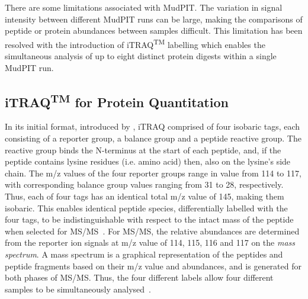 \documentclass[11pt,a4paper]{article}
\begin{document}


There are some limitations associated with MudPIT. The variation in signal intensity between different MudPIT runs can be large, making the comparisons of peptide or protein abundances between samples difficult. This limitation has been resolved with the introduction of iTRAQ\textsuperscript{TM} labelling which enables the simultaneous analysis of up to eight distinct protein digests within a single MudPIT run.

\subsection{iTRAQ\textsuperscript{TM} for Protein Quantitation}\label{subsec:iTRAQ}
In its initial format, introduced by \cite{Ross2004}, iTRAQ comprised of four isobaric tags, each consisting of a reporter group, a balance group and a peptide reactive group. The reactive group binds the N-terminus at the start of each peptide, and, if the peptide contains lysine residues (i.e. amino acid) then, also on the lysine's side chain. The m/z values of the four reporter groups range in value from 114 to 117, with corresponding balance group values ranging from 31 to 28, respectively. Thus, each of four tags has an identical total m/z value of 145, making them isobaric. This enables identical peptide species, differentially labelled with the four tags, to be indistinguishable with respect to the intact mass of the peptide when selected for MS/MS~\citep{Ross2004}. For MS/MS, the relative abundances are determined from the reporter ion signals at m/z value of 114, 115, 116 and 117 on the \emph{mass spectrum}. A mass spectrum is a graphical representation of the peptides and peptide fragments based on their m/z value and abundances, and is generated for both phases of MS/MS. Thus, the four different labels allow four different samples to be simultaneously analysed~\citep{Ross2004}.
  
\end{document}
